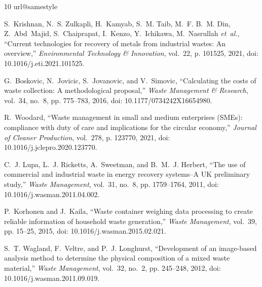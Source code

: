 \documentclass[journal,twoside,web]{ieeecolor}
\begin{document}
\begin{thebibliography}{10}
\providecommand{\url}[1]{#1}
\csname url@samestyle\endcsname
\providecommand{\newblock}{\relax}
\providecommand{\bibinfo}[2]{#2}
\providecommand{\BIBentrySTDinterwordspacing}{\spaceskip=0pt\relax}
\providecommand{\BIBentryALTinterwordstretchfactor}{4}
\providecommand{\BIBentryALTinterwordspacing}{\spaceskip=\fontdimen2\font plus
\BIBentryALTinterwordstretchfactor\fontdimen3\font minus
  \fontdimen4\font\relax}
\providecommand{\BIBforeignlanguage}[2]{{%
\expandafter\ifx\csname l@#1\endcsname\relax
\typeout{** WARNING: IEEEtran.bst: No hyphenation pattern has been}%
\typeout{** loaded for the language `#1'. Using the pattern for}%
\typeout{** the default language instead.}%
\else
\language=\csname l@#1\endcsname
\fi
#2}}
\providecommand{\BIBdecl}{\relax}
\BIBdecl

S.~Krishnan, N.~S. Zulkapli, H.~Kamyab, S.~M. Taib, M.~F. B.~M. Din,
  Z.~Abd~Majid, S.~Chaiprapat, I.~Kenzo, Y.~Ichikawa, M.~Nasrullah
  \emph{et~al.}, ``Current technologies for recovery of metals from industrial
  wastes: An overview,'' \emph{Environmental Technology \& Innovation},
  vol.~22, p. 101525, 2021, doi: 10.1016/j.eti.2021.101525.

G.~Boskovic, N.~Jovicic, S.~Jovanovic, and V.~Simovic, ``Calculating the costs
  of waste collection: A methodological proposal,'' \emph{Waste Management \&
  Research}, vol.~34, no.~8, pp. 775--783, 2016, doi: 10.1177/0734242X16654980.

R.~Woodard, ``Waste management in small and medium enterprises (SMEs): compliance with duty of care and implications for the circular economy,'' \emph{Journal of Cleaner Production}, vol.~278, p. 123770, 2021, doi: 10.1016/j.jclepro.2020.123770.

C.~J. Lupa, L.~J. Ricketts, A.~Sweetman, and B.~M.~J. Herbert, ``The use of commercial and industrial waste in energy recovery systems--A UK preliminary study,'' \emph{Waste Management}, vol.~31, no.~8, pp. 1759--1764, 2011, doi: 10.1016/j.wasman.2011.04.002.

P.~Korhonen and J.~Kaila, ``Waste container weighing data processing to create
  reliable information of household waste generation,'' \emph{Waste
  Management}, vol.~39, pp. 15--25, 2015, doi: 10.1016/j.wasman.2015.02.021.

S.~T. Wagland, F.~Veltre, and P.~J. Longhurst, ``Development of an image-based
  analysis method to determine the physical composition of a mixed waste
  material,'' \emph{Waste Management}, vol.~32, no.~2, pp. 245--248, 2012, doi: 10.1016/j.wasman.2011.09.019.


\end{thebibliography}
\end{document}
